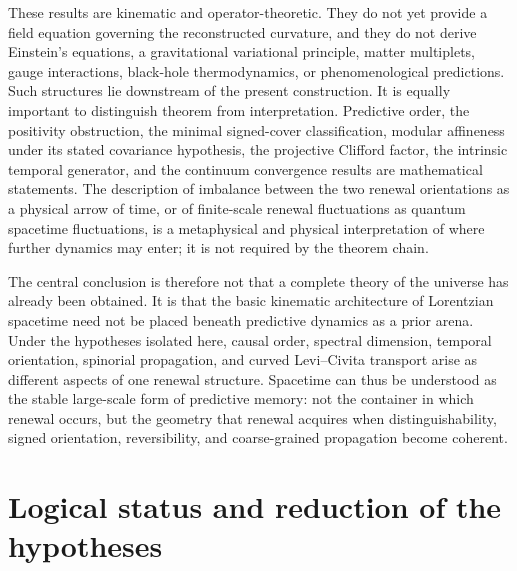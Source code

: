 \documentclass[11pt]{article}
\theoremstyle{definition}
\theoremstyle{remark}
\begin{document}
These results are kinematic and operator-theoretic.  They do not yet provide
a field equation governing the reconstructed curvature, and they do not
derive Einstein's equations, a gravitational variational principle, matter
multiplets, gauge interactions, black-hole thermodynamics, or
phenomenological predictions.  Such structures lie downstream of the present
construction.  It is equally important to distinguish theorem from
interpretation.  Predictive order, the positivity obstruction, the minimal
signed-cover classification, modular affineness under its stated covariance
hypothesis, the projective Clifford factor, the intrinsic temporal generator,
and the continuum convergence results are mathematical statements.  The
description of imbalance between the two renewal orientations as a physical
arrow of time, or
of finite-scale renewal fluctuations as quantum spacetime fluctuations, is a
metaphysical and physical interpretation of where further dynamics may enter;
it is not required by the theorem chain.

The central conclusion is therefore not that a complete theory of the
universe has already been obtained.  It is that the basic kinematic
architecture of Lorentzian spacetime need not be placed beneath predictive
dynamics as a prior arena.  Under the hypotheses isolated here, causal order,
spectral dimension, temporal orientation, spinorial propagation, and curved
Levi--Civita transport arise as different aspects of one renewal structure.
Spacetime can thus be understood as the stable large-scale form of predictive
memory: not the container in which renewal occurs, but the geometry that
renewal acquires when distinguishability, signed orientation, reversibility,
and coarse-grained propagation become coherent.




\appendix


\section{Logical status and reduction of the hypotheses}
\label{app:hypothesis-status}
\end{document}
